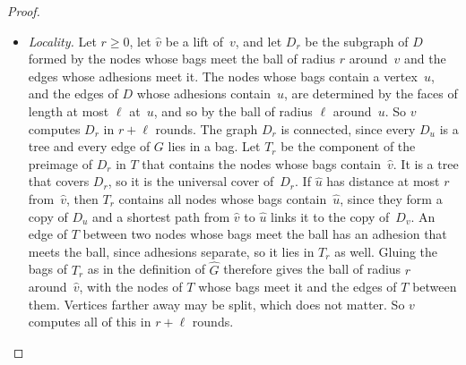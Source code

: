 \documentclass[11pt]{article}
\theoremstyle{remark}
\begin{document}
\begin{proof}
\begin{itemize}
  lift from $\hat v$, by unique path lifting, ends at $\hat v'$.
\item[(iv)] \emph{Locality.} Let $r\ge0$, let $\hat v$ be a lift of~$v$, and let $D_r$ be the
  subgraph of $D$ formed by the nodes whose bags meet the ball of radius $r$ around~$v$ and the
  edges whose adhesions meet it. The nodes whose bags contain a vertex~$u$, and the edges of $D$ whose
  adhesions contain~$u$, are determined by the faces of length at most $\ell$ at~$u$, and so by the
  ball of radius $\ell$ around~$u$. So $v$ computes $D_r$ in $r+\ell$ rounds. The graph $D_r$ is
  connected, since every $D_u$ is a tree and every edge of $G$ lies in a bag. Let $T_r$ be the
  component of the preimage of $D_r$ in $T$ that contains the nodes whose bags contain~$\hat v$. It
  is a tree that covers $D_r$, so it is the universal cover of~$D_r$. If $\hat u$ has distance at most
  $r$ from~$\hat v$, then $T_r$ contains all nodes whose bags contain~$\hat u$, since they form a copy
  of $D_u$ and a shortest path from $\hat v$ to $\hat u$ links it to the copy of~$D_v$. An edge of $T$
  between two nodes whose bags meet the ball has an adhesion that meets the ball, since adhesions
  separate, so it lies in $T_r$ as well. Gluing the bags of $T_r$ as in the definition of $\hat G$ therefore gives the ball of
  radius $r$ around~$\hat v$, with the nodes of $T$ whose bags meet it and the edges of $T$ between
  them. Vertices farther away may be split, which does not matter. So $v$ computes all of this in
  $r+\ell$ rounds.
\end{itemize}


\end{proof}
\end{document}
